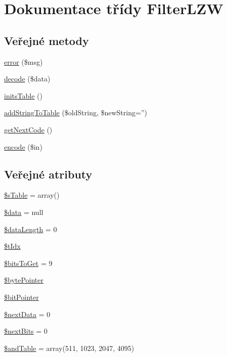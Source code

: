 \hypertarget{class_filter_l_z_w}{\section{Dokumentace třídy Filter\-L\-Z\-W}
\label{class_filter_l_z_w}
}
\subsection*{Veřejné metody}
\begin{DoxyCompactItemize}
\item 
\hyperlink{class_filter_l_z_w_aa279c27588a99c2be1363afae50cf6c7}{error} (\$msg)
\item 
\hyperlink{class_filter_l_z_w_a2677358587bba67ba7ba2f236c478d36}{decode} (\$data)
\item 
\hyperlink{class_filter_l_z_w_a98289d6d5fdab6866d7da7ac5b53e909}{inits\-Table} ()
\item 
\hyperlink{class_filter_l_z_w_afc36c8760577dda99d3cc5b1be762ac2}{add\-String\-To\-Table} (\$old\-String, \$new\-String='')
\item 
\hyperlink{class_filter_l_z_w_a5b3fe712378f621efcab282dea340ef3}{get\-Next\-Code} ()
\item 
\hyperlink{class_filter_l_z_w_ad6a6ce0a16982f96b147ad8b3f8cf892}{encode} (\$in)
\end{DoxyCompactItemize}
\subsection*{Veřejné atributy}
\begin{DoxyCompactItemize}
\item 
\hyperlink{class_filter_l_z_w_a94502219ea0cbca1334f1cb7282ad52d}{\$s\-Table} = array()
\item 
\hyperlink{class_filter_l_z_w_a6ec0e1525bcaa77a27610a2eb9d3f39c}{\$data} = null
\item 
\hyperlink{class_filter_l_z_w_a14795d6149da54c3fbe7794ad4568b8f}{\$data\-Length} = 0
\item 
\hyperlink{class_filter_l_z_w_ac6b4c616bb8f8e873233f1de77e5d59c}{\$t\-Idx}
\item 
\hyperlink{class_filter_l_z_w_ad92fc4666c3d6915b340aa7d67343c68}{\$bits\-To\-Get} = 9
\item 
\hyperlink{class_filter_l_z_w_a54df8318ce63e6f48196d53dc7221733}{\$byte\-Pointer}
\item 
\hyperlink{class_filter_l_z_w_ad24f76c50eaabb5e111878350e4f7dca}{\$bit\-Pointer}
\item 
\hyperlink{class_filter_l_z_w_aa926bc152d7d6bca1a4ba8aa163362f2}{\$next\-Data} = 0
\item 
\hyperlink{class_filter_l_z_w_a57ae5d01e13b31e5296f3b55ae21a003}{\$next\-Bits} = 0
\item 
\hyperlink{class_filter_l_z_w_ad125b5116240969fcd33acdc32e2b27e}{\$and\-Table} = array(511, 1023, 2047, 4095)
\end{DoxyCompactItemize}


